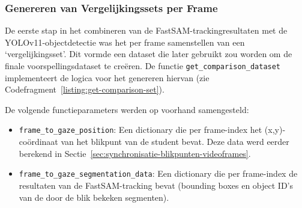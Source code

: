 \subsubsection{Genereren van Vergelijkingssets per Frame}

De eerste stap in het combineren van de FastSAM-trackingresultaten met de YOLOv11-objectdetectie was het per frame samenstellen van een `vergelijkingsset'.
Dit vormde een dataset die later gebruikt zou worden om de finale voorspellingsdataset te creëren.
De functie \texttt{get\_comparison\_dataset} implementeert de logica voor het genereren hiervan (zie Codefragment~\ref{listing:get-comparison-set}).

De volgende functieparameters werden op voorhand samengesteld:
\begin{itemize}
    \item \texttt{frame\_to\_gaze\_position}: Een dictionary die per frame-index het (x,y)-coördinaat van het 
    blikpunt van de student bevat. 
    Deze data werd eerder berekend in Sectie~\ref{sec:synchronisatie-blikpunten-videoframes}.
    \item \texttt{frame\_to\_gaze\_segmentation\_data}: Een dictionary 
    die per frame-index de resultaten van de FastSAM-tracking bevat (bounding boxes en object ID's van de door de blik bekeken segmenten).
\end{itemize}

